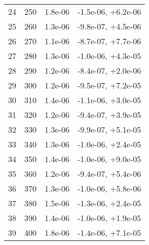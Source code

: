 \begin{table}
\begin{adjustbox}{width=1\textwidth/2}
\begin{tabular}{|c|c|c|c|}
\cline{1-4}
24 & 250 & 1.8e-06 & -1.5e-06, +6.2e-06 \\
\cline{1-4}
25 & 260 & 1.3e-06 & -9.8e-07, +4.5e-06 \\
\cline{1-4}
26 & 270 & 1.1e-06 & -8.7e-07, +7.7e-06 \\
\cline{1-4}
27 & 280 & 1.3e-06 & -1.0e-06, +4.3e-05 \\
\cline{1-4}
28 & 290 & 1.2e-06 & -8.4e-07, +2.0e-06 \\
\cline{1-4}
29 & 300 & 1.2e-06 & -9.5e-07, +7.2e-05 \\
\cline{1-4}
30 & 310 & 1.4e-06 & -1.1e-06, +3.0e-05 \\
\cline{1-4}
31 & 320 & 1.2e-06 & -9.4e-07, +3.9e-05 \\
\cline{1-4}
32 & 330 & 1.3e-06 & -9.9e-07, +5.1e-05 \\
\cline{1-4}
33 & 340 & 1.3e-06 & -1.0e-06, +2.4e-05 \\
\cline{1-4}
34 & 350 & 1.4e-06 & -1.0e-06, +9.0e-05 \\
\cline{1-4}
35 & 360 & 1.2e-06 & -9.4e-07, +5.4e-06 \\
\cline{1-4}
36 & 370 & 1.3e-06 & -1.0e-06, +5.8e-06 \\
\cline{1-4}
37 & 380 & 1.5e-06 & -1.3e-06, +2.4e-05 \\
\cline{1-4}
38 & 390 & 1.4e-06 & -1.0e-06, +1.9e-05 \\
\cline{1-4}
39 & 400 & 1.8e-06 & -1.4e-06, +7.1e-05 \\
\cline{1-4}
\end{tabular}
\end{adjustbox}
\end{table}

